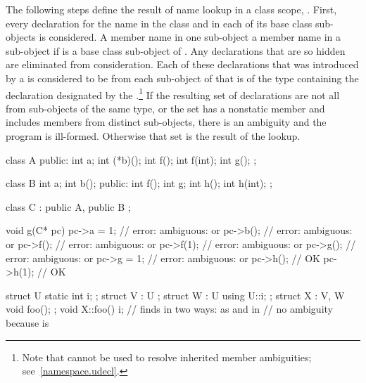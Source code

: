 \pnum
The following steps define the result of name lookup in a class scope,
. First, every declaration for the name in the class and in
each of its base class sub-objects is considered. A member name 
in one sub-object   a member name  in a
sub-object  if  is a base class sub-object of .
Any declarations that are so hidden are eliminated from consideration.
Each of these declarations that was introduced by a
 is considered to be from each sub-object
of  that is of the type containing the declaration designated
by the .\footnote{Note that
 cannot be used to resolve inherited
member ambiguities; see~\ref{namespace.udecl}.} If the resulting set of
declarations are not all from sub-objects of the same type, or the set
has a nonstatic member and includes members from distinct sub-objects,
there is an ambiguity and the program is ill-formed. Otherwise that set
is the result of the lookup.

\pnum
\enterexample

\begin{codeblock}
class A {
public:
    int a;
    int (*b)();
    int f();
    int f(int);
    int g();
};

class B {
    int a;
    int b();
public:
    int f();
    int g;
    int h();
    int h(int);
};

class C : public A, public B {};

void g(C* pc)
{
    pc->a = 1;			// error: ambiguous:  or 
    pc->b();			// error: ambiguous:  or 
    pc->f();			// error: ambiguous:  or 
    pc->f(1);			// error: ambiguous:  or 
    pc->g();			// error: ambiguous:  or 
    pc->g = 1;			// error: ambiguous:  or 
    pc->h();			// OK
    pc->h(1);			// OK
}
\end{codeblock}

\exitexampleb
\enterexample

\begin{codeblock}
struct U { static int i; };
struct V : U { };
struct W : U { using U::i; };
struct X : V, W { void foo(); };
void X::foo() {
	i;			// finds  in two ways: as  and  in 
				// no ambiguity because  is 
}
\end{codeblock}

